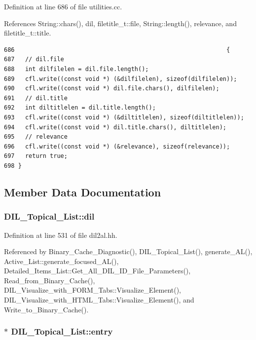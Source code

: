 Definition at line 686 of file utilities.cc.

References String::chars(), dil, filetitle\_\-t::file, String::length(), relevance, and filetitle\_\-t::title.



\footnotesize\begin{verbatim}686                                                            {
687   // dil.file
688   int dilfilelen = dil.file.length();
689   cfl.write((const void *) (&dilfilelen), sizeof(dilfilelen));
690   cfl.write((const void *) dil.file.chars(), dilfilelen);
691   // dil.title
692   int diltitlelen = dil.title.length();
693   cfl.write((const void *) (&diltitlelen), sizeof(diltitlelen));
694   cfl.write((const void *) dil.title.chars(), diltitlelen);
695   // relevance
696   cfl.write((const void *) (&relevance), sizeof(relevance));
697   return true;
698 }
\end{verbatim}\normalsize 


\subsection{Member Data Documentation}
\subsubsection{ DIL\_\-Topical\_\-List::dil}\label{classDIL__Topical__List_m0}




Definition at line 531 of file dil2al.hh.

Referenced by Binary\_\-Cache\_\-Diagnostic(), DIL\_\-Topical\_\-List(), generate\_\-AL(), Active\_\-List::generate\_\-focused\_\-AL(), Detailed\_\-Items\_\-List::Get\_\-All\_\-DIL\_\-ID\_\-File\_\-Parameters(), Read\_\-from\_\-Binary\_\-Cache(), DIL\_\-Visualize\_\-with\_\-FORM\_\-Tabs::Visualize\_\-Element(), DIL\_\-Visualize\_\-with\_\-HTML\_\-Tabs::Visualize\_\-Element(), and Write\_\-to\_\-Binary\_\-Cache().
\subsubsection{$\ast$ DIL\_\-Topical\_\-List::entry\hspace{0.3cm}{\tt  [protected]}}\label{classDIL__Topical__List_n0}




